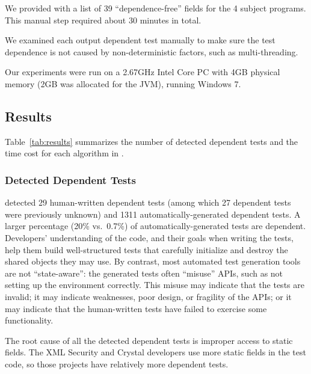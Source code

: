 We provided \ourtool with a list of 39 ``dependence-free'' fields
for the 4 subject programs. This manual step required
about 30 minutes in total.


We examined each output dependent test manually to make
sure the test dependence is not caused by non-deter\-min\-istic
factors, such as multi-threading.

Our experiments were run on a 2.67GHz Intel Core PC
with 4GB physical memory (2GB was allocated for the JVM),
running Windows 7.

\tinysqueeze
\subsection{Results}

Table~\ref{tab:results} summarizes the number of detected
dependent tests and the time cost for each algorithm
in \ourtool.


\subsubsection{Detected Dependent Tests}
\label{sec:detectedtests}


\ourtool detected 29 human-written dependent tests (among which 27
dependent tests were previously unknown) and 1311
automatically-generated dependent tests.  A larger percentage
(20\% vs.\ 0.7\%) of
automatically-generated tests are dependent.  Developers' understanding of
the code, and their goals when writing the tests, help them build
well-structured tests that carefully initialize and destroy the shared
objects they may use.
By contrast,  most automated test generation tools are not ``state-aware'': the
generated tests often ``misuse'' APIs, such as not setting up
the environment correctly.  This misuse may
indicate that the tests are invalid; it may indicate weaknesses, poor
design, or fragility of the APIs; or it may indicate that the human-written
tests have failed to exercise some functionality.


The root cause of all the detected dependent tests is improper access to
static fields. The XML Security and Crystal developers use more
static fields in the test code,
so those projects have relatively more dependent tests.

